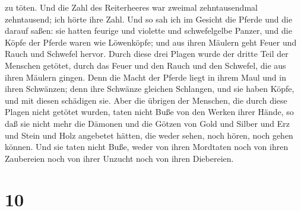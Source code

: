 zu töten.  Und die Zahl des Reiterheeres war zweimal
zehntausendmal zehntausend; ich hörte ihre Zahl.  Und so
sah ich im Gesicht die Pferde und die darauf saßen: sie hatten feurige
und violette und schwefelgelbe Panzer, und die Köpfe der Pferde waren
wie Löwenköpfe; und aus ihren Mäulern geht Feuer und Rauch und Schwefel
hervor.  Durch diese drei Plagen wurde der dritte Teil
der Menschen getötet, durch das Feuer und den Rauch und den Schwefel,
die aus ihren Mäulern gingen.  Denn die Macht der Pferde
liegt in ihrem Maul und in ihren Schwänzen; denn ihre Schwänze gleichen
Schlangen, und sie haben Köpfe, und mit diesen schädigen sie.
 Aber die übrigen der Menschen, die durch diese Plagen
nicht getötet wurden, taten nicht Buße von den Werken ihrer Hände, so
daß sie nicht mehr die Dämonen und die Götzen von Gold und Silber und
Erz und Stein und Holz angebetet hätten, die weder sehen, noch hören,
noch gehen können.  Und sie taten nicht Buße, weder von
ihren Mordtaten noch von ihren Zaubereien noch von ihrer Unzucht noch
von ihren Diebereien.

\hypertarget{section-9}{%
\section{10}\label{section-9}}

